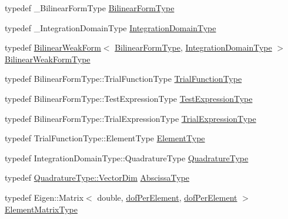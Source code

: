 \begin{DoxyCompactItemize}
\item 
typedef \+\_\+\+Bilinear\+Form\+Type \hyperlink{structmodel_1_1_bilinear_weak_form_a13052aab9ae19efbffa3d881ceb184f9}{Bilinear\+Form\+Type}
\item 
typedef \+\_\+\+Integration\+Domain\+Type \hyperlink{structmodel_1_1_bilinear_weak_form_a537e7d0cf8fa78efb38cfe017e56196b}{Integration\+Domain\+Type}
\item 
typedef \hyperlink{structmodel_1_1_bilinear_weak_form}{Bilinear\+Weak\+Form}$<$ \hyperlink{structmodel_1_1_bilinear_weak_form_a13052aab9ae19efbffa3d881ceb184f9}{Bilinear\+Form\+Type}, \hyperlink{structmodel_1_1_bilinear_weak_form_a537e7d0cf8fa78efb38cfe017e56196b}{Integration\+Domain\+Type} $>$ \hyperlink{structmodel_1_1_bilinear_weak_form_aa34216f35460fbae1533245b653038de}{Bilinear\+Weak\+Form\+Type}
\item 
typedef Bilinear\+Form\+Type\+::\+Trial\+Function\+Type \hyperlink{structmodel_1_1_bilinear_weak_form_a3c646b6d23c1e5dc29480fc04b6c9587}{Trial\+Function\+Type}
\item 
typedef Bilinear\+Form\+Type\+::\+Test\+Expression\+Type \hyperlink{structmodel_1_1_bilinear_weak_form_acdfc10bd49650e2c484d222172834edd}{Test\+Expression\+Type}
\item 
typedef Bilinear\+Form\+Type\+::\+Trial\+Expression\+Type \hyperlink{structmodel_1_1_bilinear_weak_form_a259b56acf743f646cc86607685f70791}{Trial\+Expression\+Type}
\item 
typedef Trial\+Function\+Type\+::\+Element\+Type \hyperlink{structmodel_1_1_bilinear_weak_form_a43a6e034f88493f8a1e5af511c16378b}{Element\+Type}
\item 
typedef Integration\+Domain\+Type\+::\+Quadrature\+Type \hyperlink{structmodel_1_1_bilinear_weak_form_a6d85c6150981888154a9939589f188d4}{Quadrature\+Type}
\item 
typedef \hyperlink{_spline_node_base__corder0_8h_a8e8184546c79e74baa6057b3881e572b}{Quadrature\+Type\+::\+Vector\+Dim} \hyperlink{structmodel_1_1_bilinear_weak_form_ad1e097cb2bb06eaa186ff66db5e8932e}{Abscissa\+Type}
\item 
typedef Eigen\+::\+Matrix$<$ double, \hyperlink{structmodel_1_1_bilinear_weak_form_a4897458848db3e0288687935e991b3e5}{dof\+Per\+Element}, \hyperlink{structmodel_1_1_bilinear_weak_form_a4897458848db3e0288687935e991b3e5}{dof\+Per\+Element} $>$ \hyperlink{structmodel_1_1_bilinear_weak_form_a690ee10521b3f2330a0648fab59a2aff}{Element\+Matrix\+Type}
\end{DoxyCompactItemize}
